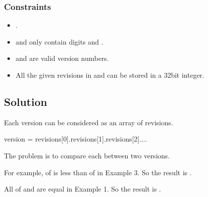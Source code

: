 \documentclass[letterpaper,12pt,english]{book}
\begin{document}
\subsubsection{Constraints}
\label{\detokenize{String/08_STR_165_Compare_Version_Numbers:constraints}}\begin{itemize}
\item {} 
\sphinxAtStartPar
{}.

\item {} 
\sphinxAtStartPar
{} and  only contain digits and .

\item {} 
\sphinxAtStartPar
{} and  are valid version numbers.

\item {} 
\sphinxAtStartPar
All the given revisions in  and  can be stored in a 32\sphinxhyphen{}bit integer.

\end{itemize}


\subsection{Solution}
\label{\detokenize{String/08_STR_165_Compare_Version_Numbers:solution}}
\sphinxAtStartPar
Each version can be considered as an array of revisions.

\begin{sphinxVerbatim}[commandchars=\\\{\}]
version = revisions[0].revisions[1].revisions[2]....
\end{sphinxVerbatim}

\sphinxAtStartPar
The problem is to compare each  between two versions.

\sphinxAtStartPar
For example,  of  is less than of  in Example 3. So the result is .

\sphinxAtStartPar
All  of  and  are equal in Example 1. So the result is .
\end{document}
